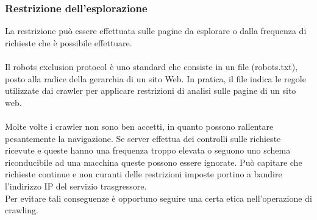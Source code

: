 \subsubsection{Restrizione dell'esplorazione}
La restrizione può essere effettuata sulle pagine da esplorare o dalla frequenza di richieste che è possibile effettuare.
\\\\
Il robots exclusion protocol è uno standard che consiste in un file (robots.txt), posto alla radice della gerarchia di un sito Web. In pratica, il file indica le regole utilizzate dai crawler per applicare restrizioni di analisi sulle pagine di un sito web. 
\\\\
Molte volte i crawler non sono ben accetti, in quanto possono rallentare pesantemente la navigazione. Se server effettua dei controlli sulle richieste ricevute e queste hanno una frequenza troppo elevata o seguono uno schema riconducibile ad una macchina queste possono essere ignorate. Può capitare che richieste continue e non curanti delle restrizioni imposte portino a bandire l'indirizzo IP del servizio trasgressore.\\
Per evitare tali conseguenze è opportuno seguire una certa etica nell'operazione di crawling.

